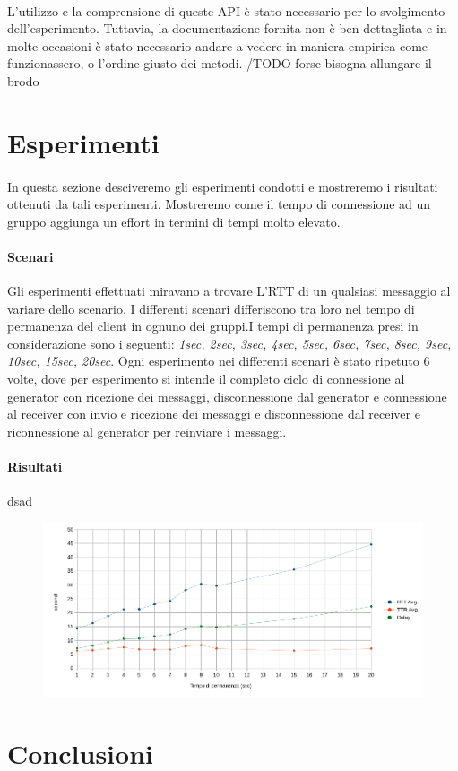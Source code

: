 \documentclass{llncs}
\begin{document}
\paragraph{} L'utilizzo e la comprensione di queste API è stato necessario per lo svolgimento dell'esperimento. Tuttavia, la documentazione fornita non è ben dettagliata e in molte occasioni è stato necessario andare a vedere in maniera empirica come funzionassero, o l'ordine giusto dei metodi.
/TODO forse bisogna allungare il brodo


\section{Esperimenti}
\paragraph{} In questa sezione desciveremo gli esperimenti condotti e mostreremo i risultati ottenuti da tali esperimenti. Mostreremo come il tempo di connessione ad un gruppo aggiunga un effort in termini di tempi molto elevato.
\paragraph{Scenari} Gli esperimenti effettuati miravano a trovare L'RTT di un qualsiasi messaggio al variare dello scenario. I differenti scenari differiscono tra loro nel tempo di permanenza del client in ognuno dei gruppi.I tempi di permanenza presi in considerazione sono i seguenti: \textit{1sec, 2sec, 3sec, 4sec, 5sec, 6sec, 7sec, 8sec, 9sec, 10sec, 15sec, 20sec}. Ogni esperimento nei differenti scenari è stato ripetuto 6 volte, dove per esperimento si intende il completo ciclo di connessione al generator con ricezione dei messaggi, disconnessione dal generator e connessione al receiver con invio e ricezione dei messaggi e disconnessione dal receiver e riconnessione al generator per reinviare i messaggi.
\paragraph{Risultati} dsad
\begin{figure}[H]
	\includegraphics[scale=0.5,center]{img/rtt.png}
	\caption{}
	\label{rtt}
\end{figure}
\noindent
	
\section{Conclusioni}



\begin{thebibliography}{}
\end{thebibliography}
\end{document}
